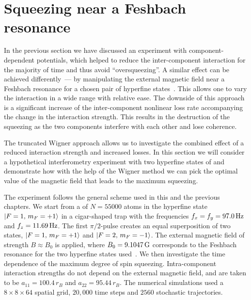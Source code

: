 \section{Squeezing near a Feshbach resonance}

In the previous section we have discussed an experiment with component-dependent potentials, which helped to reduce the inter-component interaction for the majority of time and thus avoid ``oversqueezing''.
A similar effect can be achieved differently~--- by manipulating the external magnetic field near a Feshbach resonance for a chosen pair of hyperfine states~\cite{Gross2010}.
This allows one to vary the interaction in a wide range with relative ease.
The downside of this approach is a significant increase of the inter-component nonlinear loss rate accompanying the change in the interaction strength.
This results in the destruction of the squeezing as the two components interfere with each other and lose coherence.

The truncated Wigner approach allows us to investigate the combined effect of a reduced interaction strength and increased losses.
In this section we will consider a hypothetical interferometry experiment with two hyperfine states of \Rb{} and demonstrate how with the help of the Wigner method we can pick the optimal value of the magnetic field that leads to the maximum squeezing.

The experiment follows the general scheme used in this and the previous chapters.
We start from a  of $N = 55000$ \Rb{} atoms in the hyperfine state ${\mbox{\ensuremath{\left\vert F=1,\, m_F=+1 \right\rangle}}}$ in a cigar-shaped trap with the frequencies $f_x = f_y = 97.0\mbox{\ensuremath{\,\mathrm{Hz}}}$ and $f_z = 11.69\mbox{\ensuremath{\,\mathrm{Hz}}}$.
The first $\pi/2$-pulse creates an equal superposition of two states, ${\mbox{\ensuremath{\left\vert F=1,\, m_F=+1 \right\rangle}}}$ and ${\mbox{\ensuremath{\left\vert F=2,\, m_F=-1 \right\rangle}}}$.
The external magnetic field of strength $B \approx B_0$ is applied, where $B_0 = 9.1047\mbox{\ensuremath{\,\mathrm{G}}}$ corresponds to the Feshbach resonance for the two hyperfine states used~\cite{Kaufman2009}.
We then investigate the time dependence of the maximum degree of spin squeezing.
Intra-component interaction strengths do not depend on the external magnetic field, and are taken to be $a_{11} = 100.4\,r_B$ and $a_{22} = 95.44\,r_B$.
The numerical simulations used a $8\times8\times64$ spatial grid, $20,000$ time steps and $2560$ stochastic trajectories.

